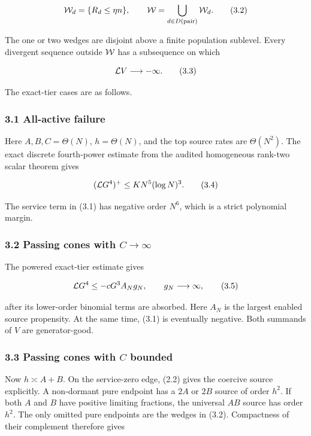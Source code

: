 \[
 {\cal W}_d=\{R_d\le\eta n\},\qquad
 {\cal W}=\bigcup_{d\in D(\mathrm{pair})}{\cal W}_d.    \tag{3.2}
\]

The one or two wedges are disjoint above a finite population sublevel.
Every divergent sequence outside \({\cal W}\) has a subsequence on which

\[
                         {\cal L}V\longrightarrow-\infty. \tag{3.3}
\]

The exact-tier cases are as follows.

\subsubsection{3.1 All-active failure}

Here \(A,B,C=\Theta(N)\), \(h=\Theta(N)\), and the top source rates are
\(\Theta(N^2)\). The exact discrete fourth-power estimate from the
audited homogeneous rank-two scalar theorem gives

\[
                    ({\cal L}G^4)^+
                    \le K N^5(\log N)^3.                \tag{3.4}
\]

The service term in (3.1) has negative order \(N^6\), which is a strict
polynomial margin.

\subsubsection{\texorpdfstring{3.2 Passing cones with
\(C\to\infty\)}{3.2 Passing cones with C\textbackslash to\textbackslash infty}}

The powered exact-tier estimate gives

\[
 {\cal L}G^4\le-cG^3A_Ng_N,\qquad g_N\longrightarrow\infty,             \tag{3.5}
\]

after its lower-order binomial terms are absorbed. Here \(A_N\) is the
largest enabled source propensity. At the same time, (3.1) is eventually
negative. Both summands of \(V\) are generator-good.

\subsubsection{\texorpdfstring{3.3 Passing cones with \(C\)
bounded}{3.3 Passing cones with C bounded}}

Now \(h\asymp A+B\). On the service-zero edge, (2.2) gives the coercive
source explicitly. A non-dormant pure endpoint has a \(2A\) or \(2B\)
source of order \(h^2\). If both \(A\) and \(B\) have positive limiting
fractions, the universal \(AB\) source has order \(h^2\). The only
omitted pure endpoints are the wedges in (3.2). Compactness of their
complement therefore gives

